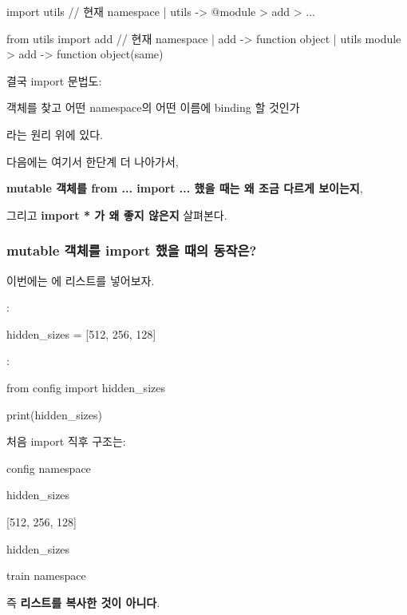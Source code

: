 \begin{dhkdir}
import utils // 현재 namespace
| utils -> @module
> add
> ...
\end{dhkdir}

\begin{dhkdir}
from utils import add // 현재 namespace
| add -> function object
| utils module
> add -> function object(same)
\end{dhkdir}

결국 import 문법도:

\begin{dhksmry}[centered]
객체를 찾고 \ra 어떤 namespace의 어떤 이름에 binding 할 것인가
\end{dhksmry}

라는 원리 위에 있다.

다음에는 여기서 한단계 더 나아가서,

\textbf{mutable 객체를 from ... import ... 했을 때는 왜 조금 다르게 보이는지},

그리고 \textbf{import * 가 왜 좋지 않은지} 살펴본다.

\subsubsection{mutable 객체를 import 했을 때의 동작은?}

이번에는 에 리스트를 넣어보자.

:

\begin{dhkcode}
hidden_sizes = [512, 256, 128]
\end{dhkcode}

:

\begin{dhkcode}
from config import hidden_sizes

print(hidden_sizes)
\end{dhkcode}

처음 import 직후 구조는:

\begin{dhksmry}[centered]
config namespace

hidden_sizes

\da

[512, 256, 128]

\ua

hidden_sizes

train namespace
\end{dhksmry}

즉 \textbf{리스트를 복사한 것이 아니다}.


